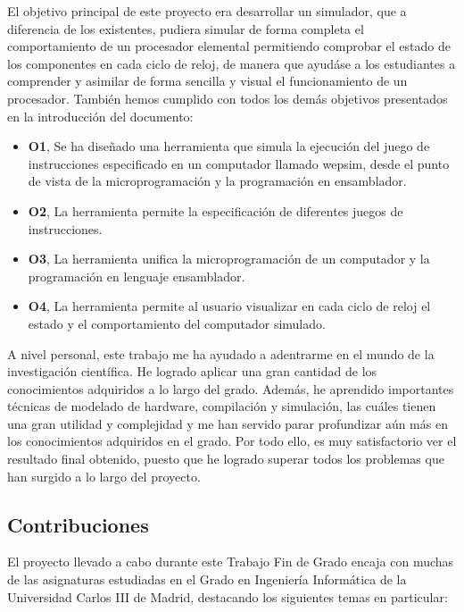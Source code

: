 El objetivo principal de este proyecto era desarrollar un simulador, que a diferencia de los existentes, pudiera simular de forma completa el comportamiento de un procesador elemental permitiendo comprobar el estado de los componentes en cada ciclo de reloj, de manera que ayudáse a los estudiantes a comprender y asimilar de forma sencilla y visual el funcionamiento de un procesador.  También hemos cumplido con todos los demás objetivos presentados en la introducción del documento:

\begin{itemize}

\item \textbf{O1}, Se ha diseñado una herramienta que simula la ejecución del juego de instrucciones especificado en un computador llamado \acrshort{wepsim}, desde el punto de vista de la microprogramación y la programación en \gls{ensamblador}.

\item \textbf{O2}, La herramienta permite la especificación de diferentes juegos de instrucciones.

\item \textbf{O3}, La herramienta unifica la microprogramación de un computador y la programación en lenguaje \gls{ensamblador}.

\item \textbf{O4}, La herramienta permite al usuario visualizar en cada ciclo de reloj el estado y el comportamiento del computador simulado.

\end{itemize}

A nivel personal, este trabajo me ha ayudado a adentrarme en el mundo de la investigación científica. He logrado aplicar una gran cantidad de los conocimientos adquiridos a lo largo del grado. Además, he aprendido importantes técnicas de modelado de \gls{hardware}, compilación y simulación, las cuáles tienen una gran utilidad y complejidad y me han servido parar profundizar aún más en los conocimientos adquiridos en el grado. Por todo ello, es muy satisfactorio ver el resultado final obtenido, puesto que he logrado superar todos los problemas que han surgido a lo largo del proyecto.

\subsection{Contribuciones}

El proyecto llevado a cabo durante este Trabajo Fin de Grado encaja con muchas de las asignaturas estudiadas en el Grado en Ingeniería Informática de la Universidad Carlos III de Madrid, destacando los siguientes temas en particular:

